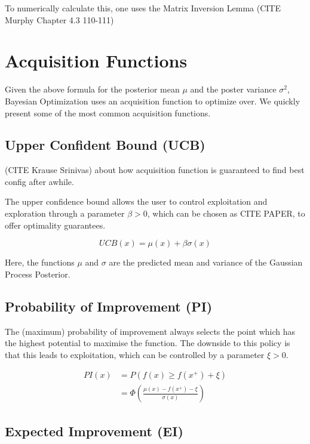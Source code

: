 To numerically calculate this, one uses the Matrix Inversion Lemma (CITE Murphy Chapter 4.3 110-111)


\section{Acquisition Functions}

Given the above formula for the posterior mean $\mu$ and the poster variance $\sigma^2$, Bayesian Optimization uses an acquisition function to optimize over.
We quickly present some of the most common acquisition functions.


\subsection{Upper Confident Bound (UCB)}
(CITE Krause Srinivas) about how acquisition function is guaranteed to find best config after awhile.

The upper confidence bound allows the user to control exploitation and exploration through a parameter $\beta > 0$, which can be chosen as CITE PAPER, to offer optimality guarantees.

\begin{equation}
UCB(x) = \mu(x) + \beta \sigma(x)
\end{equation}

Here, the functions $\mu$ and $\sigma$ are the predicted mean and variance of the Gaussian Process Posterior.

\subsection{Probability of Improvement (PI)}
The (maximum) probability of improvement always selects the point which has the highest potential to maximise the function. 
The downside to this policy is that this leads to exploitation, which can be controlled by a parameter $\xi > 0$.

\begin{align}
    PI(x) & = P( f(x) \geq f(x^+) + \xi ) \\
    & = \Phi ( \frac{\mu(x) - f(x^+) - \xi}{\sigma(x)}  ) 
\end{align}


\subsection{Expected Improvement (EI)}

